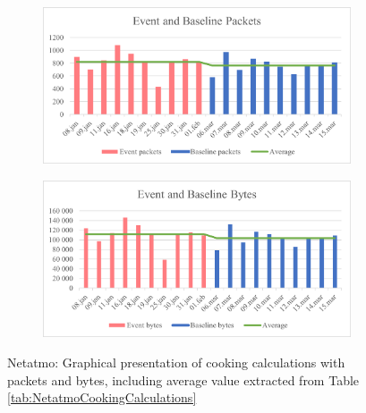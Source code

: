 \begin{figure}[H]
    \centering
    \begin{subfigure}{1\textwidth}
       \centering
       \includegraphics[width=1\hsize]{figures/Netatmo_Cooking_Calculations_Packets.png} 
    \end{subfigure}
    \begin{subfigure}{1\textwidth}
        \centering
        \includegraphics[width=1\hsize]{figures/Netatmo_Cooking_Calculations_Bytes.png} 
    \end{subfigure}
    \caption{Netatmo: Graphical presentation of cooking calculations with packets and bytes, including average value extracted from Table \ref{tab:NetatmoCookingCalculations}}
    \label{fig:NetatmoCookingCalculations}
\end{figure}

